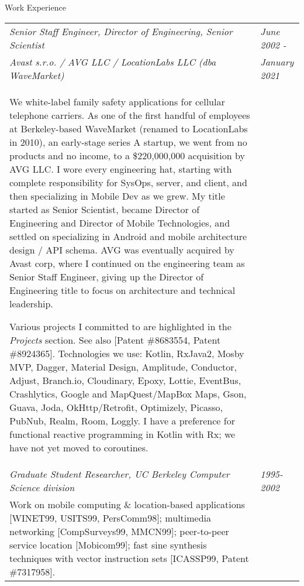 
\begin{bf} \large
Work Experience
\end{bf}
\medskip

\begin{tabular}{p{5.2in}@{\hspace{1.5cm}}l}

	\em Senior Staff Engineer, Director of Engineering, Senior Scientist 	    & \em June 2002 -  \\
	 \em  Avast s.r.o. / AVG LLC / LocationLabs LLC (dba WaveMarket)  	& \em January 2021 \\[4pt]
	
	   We white-label family safety applications for cellular telephone carriers.
	   As one of the first handful of employees at Berkeley-based WaveMarket (renamed to LocationLabs
	   in 2010),
	   an early-stage series A startup, we went from no products and no income, to a \$220,000,000
	   acquisition by AVG LLC.  I wore every engineering hat, starting with complete responsibility
	   for SysOps, server, and client, and then specializing in Mobile Dev as we grew.  My title started
	   as Senior Scientist, became Director of Engineering and Director of
	   Mobile Technologies, and settled on specializing in Android and mobile architecture design / API schema.
	   AVG was eventually acquired by Avast corp, where I continued on the engineering team as
	   Senior Staff Engineer, giving up the Director of Engineering title to focus on architecture and technical
	   leadership.
	   \smallskip

	   Various projects I committed to are highlighted in the {\em Projects} section.
	   See also [Patent \#8683554, Patent \#8924365]. Technologies we use: Kotlin, RxJava2, Mosby MVP,
	   Dagger, Material Design, Amplitude, Conductor, Adjust, Branch.io, Cloudinary, Epoxy, Lottie, EventBus, Crashlytics,
	   Google and MapQuest/MapBox Maps, Gson, Guava, Joda, OkHttp/Retrofit, Optimizely, Picasso, PubNub,
	   Realm, Room, Loggly.	 I have a preference for functional reactive programming in Kotlin with Rx;
	   we have not yet moved to coroutines.  \\[9pt]
	  
    \em Graduate Student Researcher, UC Berkeley Computer Science division
                                                                 & \em 1995-2002 \\[3pt]
       Work on mobile computing \& location-based applications 
       [WINET99, USITS99, PersComm98]; 
       multimedia networking [CompSurveys99, MMCN99];
       peer-to-peer service location [Mobicom99];
       fast sine synthesis techniques with vector instruction 
       sets [ICASSP99, Patent \#7317958]. \\[9pt]


\end{tabular}
